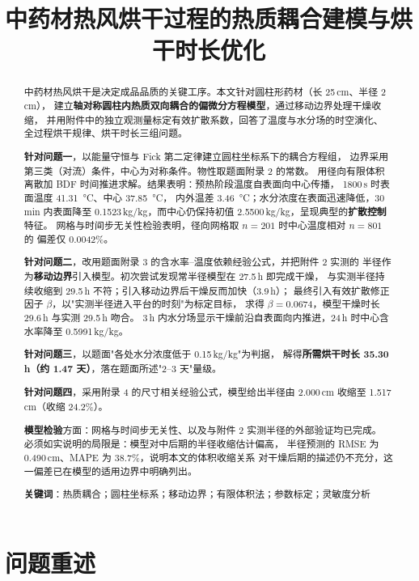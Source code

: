 \documentclass[withoutpreface,bwprint]{cumcmthesis}
\title{中药材热风烘干过程的热质耦合建模与烘干时长优化}
\begin{document}
\maketitle

\begin{abstract}
中药材热风烘干是决定成品品质的关键工序。本文针对圆柱形药材（长 25\,cm、半径 2\,cm），
建立\textbf{轴对称圆柱内热质双向耦合的偏微分方程模型}，通过移动边界处理干燥收缩，
并用附件中的独立观测量标定有效扩散系数，回答了温度与水分场的时空演化、
全过程烘干规律、烘干时长三组问题。

\textbf{针对问题一}，以能量守恒与 Fick 第二定律建立圆柱坐标系下的耦合方程组，
边界采用第三类（对流）条件，中心为对称条件。物性取题面附录 2 的常数。
用径向有限体积离散加 BDF 时间推进求解。结果表明：预热阶段温度自表面向中心传播，
1800\,s 时表面温度 \SI{41.31}{\celsius}、中心 \SI{37.85}{\celsius}，
内外温差 \SI{3.46}{\celsius}；水分浓度在表面迅速降低，30\,min 内表面降至
0.1523\,kg/kg，而中心仍保持初值 2.5500\,kg/kg，呈现典型的\textbf{扩散控制}特征。
网格与时间步无关性检验表明，径向网格取 $n=201$ 时中心温度相对 $n=801$ 的
偏差仅 0.0042\%。

\textbf{针对问题二}，改用题面附录 3 的含水率--温度依赖经验公式，并把附件 2 实测的
半径作为\textbf{移动边界}引入模型。初次尝试发现常半径模型在 27.5\,h 即完成干燥，
与实测半径持续收缩到 29.5\,h 不符；引入移动边界后干燥反而加快（3.9\,h）；
最终引入有效扩散修正因子 $\beta$，以"实测半径进入平台的时刻"为标定目标，
求得 $\beta=0.0674$，模型干燥时长 29.6\,h 与实测 29.5\,h 吻合。
3\,h 内水分场显示干燥前沿自表面向内推进，24\,h 时中心含水率降至 0.5991\,kg/kg。

\textbf{针对问题三}，以题面"各处水分浓度低于 0.15\,kg/kg"为判据，
解得\textbf{所需烘干时长 35.30\,h（约 1.47 天）}，落在题面所述"2--3 天"量级。

\textbf{针对问题四}，采用附录 4 的尺寸相关经验公式，模型给出半径由 2.000\,cm
收缩至 1.517\,cm（收缩 24.2\%）。

\textbf{模型检验}方面：网格与时间步无关性、以及与附件 2 实测半径的外部验证均已完成。
必须如实说明的局限是：模型对中后期的半径收缩估计偏高，
半径预测的 RMSE 为 0.490\,cm、MAPE 为 38.7\%，说明本文的体积收缩关系
对干燥后期的描述仍不充分，这一偏差已在模型的适用边界中明确列出。

\textbf{关键词}：热质耦合；圆柱坐标系；移动边界；有限体积法；参数标定；灵敏度分析
\end{abstract}

\section{问题重述}
\end{document}

